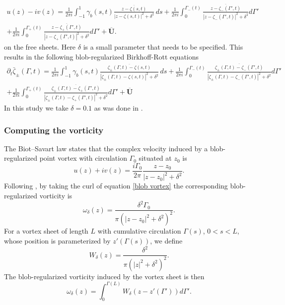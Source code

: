 \documentclass{article}[12pt]
\theoremstyle{Theorem}
\begin{document}
\begin{multline}
     u(z) - iv(z) = \frac{1}{2\pi i}\int_{-1}^{1}{\gamma_b(s,t)\frac{\overline{z- \zeta(s,t)}}{|z- \zeta(s,t)|^2 + \delta^2}\, ds} + \frac{1}{2\pi i}\int_{0}^{\Gamma_-(t)}{\frac{\overline{z - \zeta_{-}(\Gamma',t)}}{|z - \zeta_{-}(\Gamma',t)|^2 + \delta^2}d\Gamma'} \\ +
     \frac{1}{2\pi i}\int_{0}^{\Gamma_+(t)}{\frac{\overline{z - \zeta_{+}(\Gamma',t)}}{|z - \zeta_{+}(\Gamma',t)|^2 + \delta^2}d\Gamma'}+ \overline{\boldsymbol{U}}. \label{ConjVelSmoothed}
\end{multline}
on the free sheets. Here $\delta$ is a small parameter that needs to be specified. This results in the following blob-regularized Birkhoff-Rott equations
\begin{multline} \label{blob regularized birkhoff rott equations}
     \partial_{t}\bar\zeta_{\pm}(\Gamma,t)= \frac{1}{2\pi i}\int_{-1}^{1} \gamma_b(s,t) \frac{\overline{\zeta_\pm(\Gamma,t) - \zeta(s,t)}}{|\zeta_\pm(\Gamma,t) - \zeta(s,t)|^2 + \delta^2}\, ds
    + \frac{1}{2\pi i}\int_{0}^{\Gamma_-(t)}{\frac{\overline{\zeta_{\pm}(\Gamma,t) - \zeta_{-}(\Gamma',t)}}{|\zeta_{\pm}(\Gamma,t) - \zeta_{-}(\Gamma',t)|^2 + \delta^2}d\Gamma'} \\ + 
     \frac{1}{2\pi i}\int_{0}^{\Gamma_+(t)}{\frac{\overline{\zeta_{\pm}(\Gamma,t) - \zeta_{+}(\Gamma',t)}}{|\zeta_{\pm}(\Gamma,t) - \zeta_{+}(\Gamma',t)|^2 + \delta^2}d\Gamma'}+ \overline{\boldsymbol{U}}
\end{multline}
In this study we take $\delta = 0.1$ as was done in \cite{loo2026comparisoninviscidviscousvortex}.

\subsubsection{Computing the vorticity}

The Biot--Savart law states that the complex velocity induced by a blob-regularized point vortex with circulation $\Gamma_0$ situated at $z_0$ is
\begin{equation}
u(z)+iv(z)
=
\frac{i\Gamma_0}{2\pi}
\frac{z-z_0}{|z-z_0|^2+\delta^2}.
\label{blob vortex}
\end{equation}
Following \cite{holm2006euler}, by taking the curl of equation \eqref{blob vortex} the corresponding blob-regularized vorticity is
\begin{equation}
\omega_\delta(z)
=
\frac{\delta^2\Gamma_0}
{\pi\left(|z-z_0|^2+\delta^2\right)^2}.
\end{equation}
For a vortex sheet of length $L$ with cumulative circulation $\Gamma(s)$, $0<s<L$, whose position is parameterized by $z'(\Gamma(s))$, we define
\begin{equation}
W_\delta(z)
=
\frac{\delta^2}
{\pi\left(|z|^2+\delta^2\right)^2}.
\end{equation}
The blob-regularized vorticity induced by the vortex sheet is then
\begin{equation}
\omega_\delta(z)
=
\int_0^{\Gamma(L)}
W_\delta\!\left(z-z'(\Gamma')\right)d\Gamma'.
\label{vorticity formula}
\end{equation}
\end{document}
